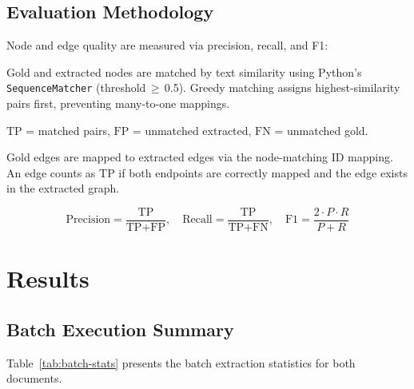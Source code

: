 \documentclass[12pt,a4paper]{article}
\begin{document}
\subsection{Evaluation Methodology}

Node and edge quality are measured via precision, recall, and F1:

\begin{description}[leftmargin=2em]
    \item[Node matching:] Gold and extracted nodes are matched by text similarity using Python's \texttt{SequenceMatcher} (threshold\,$\geq$\,0.5). Greedy matching assigns highest-similarity pairs first, preventing many-to-one mappings.
    \item[Node metrics:] $\text{TP}$ = matched pairs, $\text{FP}$ = unmatched extracted, $\text{FN}$ = unmatched gold.
    \item[Edge metrics:] Gold edges are mapped to extracted edges via the node-matching ID mapping. An edge counts as TP if both endpoints are correctly mapped and the edge exists in the extracted graph.
\end{description}

\begin{equation}
\text{Precision} = \frac{\text{TP}}{\text{TP} + \text{FP}}, \quad
\text{Recall} = \frac{\text{TP}}{\text{TP} + \text{FN}}, \quad
\text{F1} = \frac{2 \cdot P \cdot R}{P + R}
\end{equation}

\section{Results}
\label{sec:results}

\subsection{Batch Execution Summary}

Table~\ref{tab:batch-stats} presents the batch extraction statistics for both documents.
\end{document}

